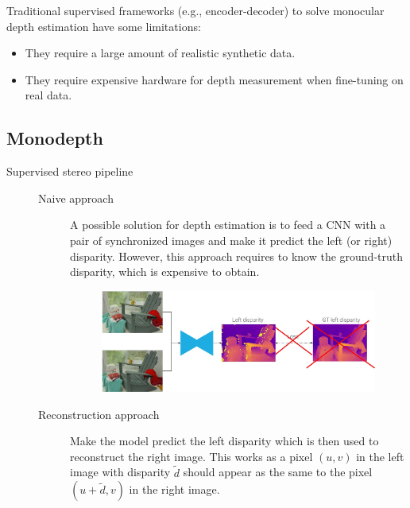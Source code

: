 \begin{remark}
    Traditional supervised frameworks (e.g., encoder-decoder) to solve monocular depth estimation have some limitations:
    \begin{itemize}
        \item They require a large amount of realistic synthetic data.
        \item They require expensive hardware for depth measurement when fine-tuning on real data.
    \end{itemize}
\end{remark}


\subsection{Monodepth}

\begin{description}
    \item[Supervised stereo pipeline] 
        \phantom{}
        \begin{description}
            \item[Naive approach] 
                A possible solution for depth estimation is to feed a CNN with a pair of synchronized images and make it predict the left (or right) disparity. However, this approach requires to know the ground-truth disparity, which is expensive to obtain.

                \begin{figure}[H]
                    \centering
                    \includegraphics[width=0.7\linewidth]{./img/_stereo_pipeline_naive.jpg}
                \end{figure}

            \item[Reconstruction approach]
                Make the model predict the left disparity which is then used to reconstruct the right image. This works as a pixel $(u, v)$ in the left image with disparity $\tilde{d}$ should appear as the same to the pixel $(u+\tilde{d}, v)$ in the right image.


\end{description}
\end{description}

